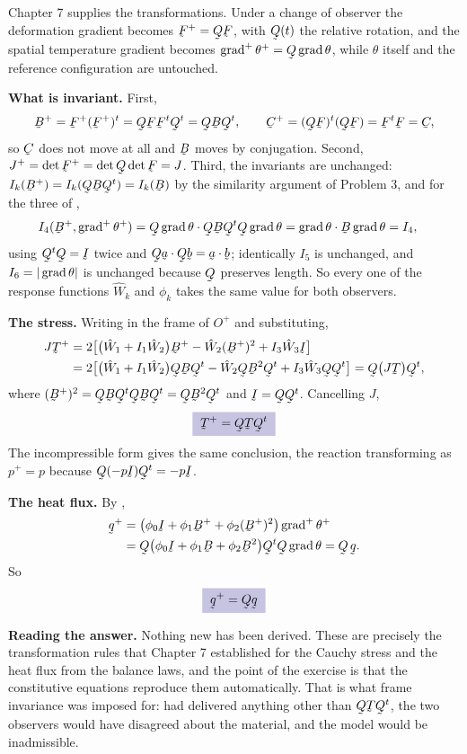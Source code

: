 \begin{solution}
Chapter 7 supplies the transformations. Under a change of observer the
deformation gradient becomes $\bF^{+}=\bQ\bF$, with $\bQ(t)$ the
relative rotation, and the spatial temperature gradient becomes
$\grad^{+}\theta^{+}=\bQ\grad\theta$, while $\theta$ itself and the
reference configuration are untouched.

\textbf{What is invariant.} First,
\[
   \bB^{+}=\bF^{+}(\bF^{+})^{t}=\bQ\bF\bF^{t}\bQ^{t}=\bQ\bB\bQ^{t},
   \qquad
   \bC^{+}=(\bQ\bF)^{t}(\bQ\bF)=\bF^{t}\bF=\bC ,
\]
so $\bC$ does not move at all and $\bB$ moves by conjugation. Second,
$J^{+}=\det\bF^{+}=\det\bQ\det\bF=J$. Third, the invariants are
unchanged: $I_{k}(\bB^{+})=I_{k}(\bQ\bB\bQ^{t})=I_{k}(\bB)$ by the
similarity argument of Problem 3, and for the three of ,
\[
\begin{aligned}
   I_{4}(\bB^{+},\grad^{+}\theta^{+})
   &=\ip{\bQ\grad\theta}{\bQ\bB\bQ^{t}\bQ\grad\theta}
   =\ip{\grad\theta}{\bB\grad\theta}=I_{4},
\end{aligned}
\]
using $\bQ^{t}\bQ=\I$ twice and $\ip{\bQ\ba}{\bQ\bb}=\ip\ba\bb$;
identically $I_{5}$ is unchanged, and $I_{6}=|\operatorname{grad}\theta|$ is unchanged
because $\bQ$ preserves length. So every one of the response functions
$\hat W_{k}$ and $\phi_{k}$ takes the same value for both observers.

\textbf{The stress.} Writing  in the frame of $O^{+}$ and
substituting,
\[
\begin{aligned}
   J\bT^{+}&=2\big[\big(\hat W_{1}+I_{1}\hat W_{2}\big)\bB^{+}
   -\hat W_{2}(\bB^{+})^{2}+I_{3}\hat W_{3}\I\big]\\
   &=2\big[\big(\hat W_{1}+I_{1}\hat W_{2}\big)\bQ\bB\bQ^{t}
   -\hat W_{2}\bQ\bB^{2}\bQ^{t}+I_{3}\hat W_{3}\bQ\bQ^{t}\big]
   =\bQ\big(J\bT\big)\bQ^{t},
\end{aligned}
\]
where $(\bB^{+})^{2}=\bQ\bB\bQ^{t}\bQ\bB\bQ^{t}=\bQ\bB^{2}\bQ^{t}$ and
$\I=\bQ\bQ^{t}$. Cancelling $J$,
\[
   \boxed{\;\bT^{+}=\bQ\bT\bQ^{t}\;}
\]
The incompressible form  gives the same conclusion, the
reaction transforming as $p^{+}=p$ because $\bQ(-p\I)\bQ^{t}=-p\I$.

\textbf{The heat flux.} By ,
\[
\begin{aligned}
   \bq^{+}&=\big(\phi_{0}\I+\phi_{1}\bB^{+}+\phi_{2}(\bB^{+})^{2}\big)
   \grad^{+}\theta^{+}\\
   &=\bQ\big(\phi_{0}\I+\phi_{1}\bB+\phi_{2}\bB^{2}\big)\bQ^{t}
   \bQ\grad\theta
   =\bQ\,\bq .
\end{aligned}
\]
So
\[
   \boxed{\;\bq^{+}=\bQ\bq\;}
\]

\textbf{Reading the answer.} Nothing new has been derived. These are
precisely the transformation rules that Chapter 7 established for the
Cauchy stress and the heat flux from the balance laws, and the point of
the exercise is that the constitutive equations reproduce them
automatically. That is what frame invariance was imposed for: had
 delivered anything other than $\bQ\bT\bQ^{t}$, the two
observers would have disagreed about the material, and the model would
be inadmissible.
\end{solution}

